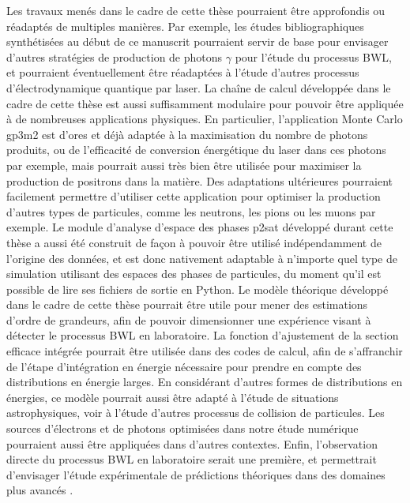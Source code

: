 \begin{refsection}
Les travaux menés dans le cadre de cette thèse pourraient être approfondis ou réadaptés de multiples manières.
Par exemple, les études bibliographiques synthétisées au début de ce manuscrit pourraient servir de base pour envisager d'autres stratégies de production de photons $\gamma$ pour l'étude du processus BWL, et pourraient éventuellement être réadaptées à l'étude d'autres processus d'électrodynamique quantique par laser.
La chaîne de calcul développée dans le cadre de cette thèse est aussi suffisamment modulaire pour pouvoir être appliquée à de nombreuses applications physiques. 
En particulier, l'application Monte Carlo gp3m2 est d'ores et déjà adaptée à la maximisation du nombre de photons produits, ou de l'efficacité de conversion énergétique du laser dans ces photons par exemple, mais pourrait aussi très bien être utilisée pour maximiser la production de positrons dans la matière. Des adaptations ultérieures pourraient facilement permettre d'utiliser cette application pour optimiser la production d'autres types de particules, comme les neutrons, les pions ou les muons par exemple.
Le module d'analyse d'espace des phases p2sat développé durant cette thèse a aussi été construit de façon à pouvoir être utilisé indépendamment de l'origine des données, et est donc nativement adaptable à n'importe quel type de simulation utilisant des espaces des phases de particules, du moment qu'il est possible de lire ses fichiers de sortie en Python.
Le modèle théorique développé dans le cadre de cette thèse pourrait être utile pour mener des estimations d'ordre de grandeurs, afin de pouvoir dimensionner une expérience visant à détecter le processus BWL en laboratoire. La fonction d'ajustement de la section efficace intégrée pourrait être utilisée dans des codes de calcul, afin de s'affranchir de l'étape d'intégration en énergie nécessaire pour prendre en compte des distributions en énergie larges. En considérant d'autres formes de distributions en énergies, ce modèle pourrait aussi être adapté à l'étude de situations astrophysiques, voir à l'étude d'autres processus de collision de particules.
Les sources d'électrons et de photons optimisées dans notre étude numérique pourraient aussi être appliquées dans d'autres contextes. 
Enfin, l'observation directe du processus BWL en laboratoire serait une première, et permettrait d'envisager l'étude expérimentale de prédictions théoriques dans des domaines plus avancés \parencite{hartin_2007, satunin_2018}.

\newpage
\printbibliography[heading=subbibintoc]
\end{refsection}
